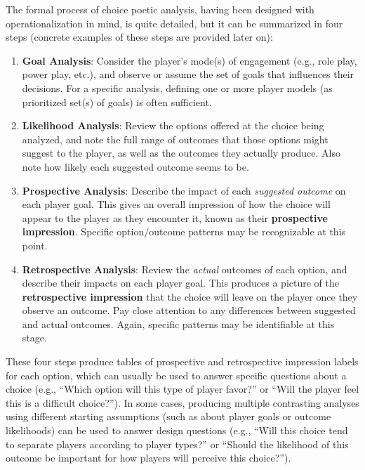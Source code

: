 \documentclass[arts,article,submit,moreauthors,pdftex,10pt,a4paper]{Definitions/mdpi}
\begin{document}
\label{sec:analysis_steps}
The formal process of choice poetic analysis, having been designed with operationalization in mind, is quite detailed, but it can be summarized in four steps (concrete examples of these steps are provided later on):
\begin{enumerate}
  \item \textbf{Goal Analysis}: Consider the player's mode(s) of engagement (e.g., role play, power play, etc.), and observe or assume the set of goals that influences their decisions. For a specific analysis, defining one or more player models (as prioritized set(s) of goals) is often sufficient.
  \item \textbf{Likelihood Analysis}: Review the options offered at the choice being analyzed, and note the full range of outcomes that those options might suggest to the player, as well as the outcomes they actually produce. Also note how likely each suggested outcome seems to be.
  \item \textbf{Prospective Analysis}: Describe the impact of each \emph{suggested outcome} on each player goal. This gives an overall impression of how the choice will appear to the player as they encounter it, known as their \textbf{prospective impression}. Specific option/outcome patterns may be recognizable at this point.
  \item \textbf{Retrospective Analysis}: Review the \emph{actual} outcomes of each option, and describe their impacts on each player goal. This produces a picture of the \textbf{retrospective impression} that the choice will leave on the player once they observe an outcome. Pay close attention to any differences between suggested and actual outcomes. Again, specific patterns may be identifiable at this stage.
\end{enumerate}
These four steps produce tables of prospective and retrospective impression labels for each option, which can usually be used to answer specific questions about a choice (e.g., ``Which option will this type of player favor?'' or ``Will the player feel this is a difficult choice?'').
%
In some cases, producing multiple contrasting analyses using different starting assumptions (such as about player goals or outcome likelihoods) can be used to answer design questions (e.g., ``Will this choice tend to separate players according to player types?'' or ``Should the likelihood of this outcome be important for how players will perceive this choice?'').

\label{sec:prospective_labels}
\end{document}
